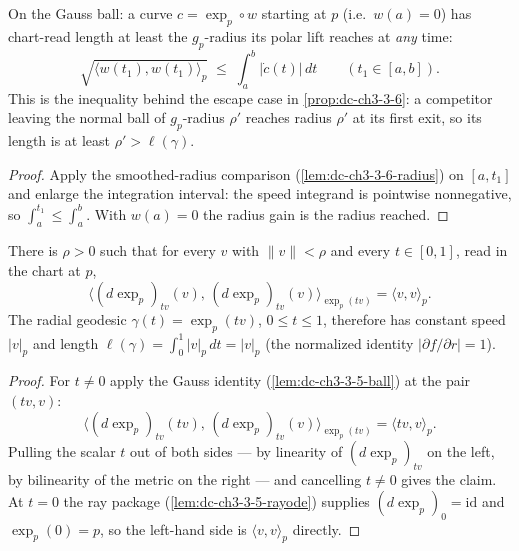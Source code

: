 \begin{lemma}
  \label{lem:dc-ch3-3-6-reach}
  \leanok
  On the Gauss ball: a curve $c=\exp_p\circ w$ starting at $p$ (i.e.\
  $w(a)=0$) has chart-read length at least the $g_p$-radius its polar lift
  reaches at \emph{any} time:
  $$\sqrt{\langle w(t_1),w(t_1)\rangle_p}\;\le\;\int_a^b|\dot c(t)|\,dt
    \qquad(t_1\in[a,b]).$$
  This is the inequality behind the escape case in
  \cref{prop:dc-ch3-3-6}: a competitor leaving the normal ball of
  $g_p$-radius $\rho'$ reaches radius $\rho'$ at its first exit, so its
  length is at least $\rho'>\ell(\gamma)$.
\end{lemma}
\begin{proof}
  \sketch
  \leanok
  Apply the smoothed-radius comparison (\cref{lem:dc-ch3-3-6-radius}) on
  $[a,t_1]$ and enlarge the integration interval: the speed integrand is
  pointwise nonnegative, so $\int_a^{t_1}\le\int_a^b$. With $w(a)=0$ the
  radius gain is the radius reached.
\end{proof}

\begin{lemma}
  \label{lem:dc-ch3-3-6-rayspeed}
  \leanok
  There is $\rho>0$ such that for every $v$ with $\|v\|<\rho$ and every
  $t\in[0,1]$, read in the chart at $p$,
  $$\big\langle(d\exp_p)_{tv}(v),\,(d\exp_p)_{tv}(v)\big\rangle_{\exp_p(tv)}
    =\langle v,v\rangle_p.$$
  The radial geodesic $\gamma(t)=\exp_p(tv)$, $0\le t\le1$, therefore has
  constant speed $|v|_p$ and length
  $\ell(\gamma)=\int_0^1|v|_p\,dt=|v|_p$ (the normalized identity
  $|\partial f/\partial r|=1$).
\end{lemma}
\begin{proof}
  \sketch
  \leanok
  For $t\ne0$ apply the Gauss identity (\cref{lem:dc-ch3-3-5-ball}) at the
  pair $(tv,v)$:
  $$\big\langle(d\exp_p)_{tv}(tv),\,(d\exp_p)_{tv}(v)\big\rangle_{\exp_p(tv)}
    =\langle tv,v\rangle_p.$$
  Pulling the scalar $t$ out of both sides — by linearity of $(d\exp_p)_{tv}$
  on the left, by bilinearity of the metric on the right — and cancelling
  $t\ne0$ gives the claim. At $t=0$ the ray package
  (\cref{lem:dc-ch3-3-5-rayode}) supplies $(d\exp_p)_0=\mathrm{id}$ and
  $\exp_p(0)=p$, so the left-hand side is $\langle v,v\rangle_p$ directly.

\end{proof}

